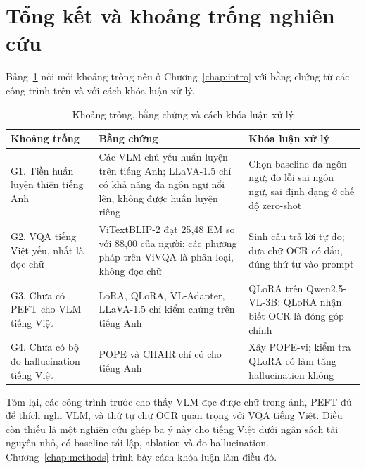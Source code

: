 \section{Tổng kết và khoảng trống nghiên cứu}
\label{sec:rel-summary}

Bảng~\ref{tab:rel-gaps} nối mỗi khoảng trống nêu ở Chương~\ref{chap:intro} với
bằng chứng từ các công trình trên và với cách khóa luận xử lý.

\begin{table}[htbp]
\caption{Khoảng trống, bằng chứng và cách khóa luận xử lý}
\label{tab:rel-gaps}
\centering
\small
\begin{tabular}{p{}p{}p{}}
\toprule
\textbf{Khoảng trống} & \textbf{Bằng chứng} & \textbf{Khóa luận xử lý} \\
\midrule
G1. Tiền huấn luyện thiên tiếng Anh & Các VLM chủ yếu huấn luyện trên tiếng Anh; LLaVA-1.5 chỉ có khả năng đa ngôn ngữ nổi lên, không được huấn luyện riêng & Chọn baseline đa ngôn ngữ; đo lỗi sai ngôn ngữ, sai định dạng ở chế độ zero-shot \\
G2. VQA tiếng Việt yếu, nhất là đọc chữ & ViTextBLIP-2 đạt 25,48 EM so với 88,00 của người; các phương pháp trên ViVQA là phân loại, không đọc chữ & Sinh câu trả lời tự do; đưa chữ OCR có dấu, đúng thứ tự vào prompt \\
G3. Chưa có PEFT cho VLM tiếng Việt & LoRA, QLoRA, VL-Adapter, LLaVA-1.5 chỉ kiểm chứng trên tiếng Anh & QLoRA trên Qwen2.5-VL-3B; QLoRA nhận biết OCR là đóng góp chính \\
G4. Chưa có bộ đo hallucination tiếng Việt & POPE và CHAIR chỉ có cho tiếng Anh & Xây POPE-vi; kiểm tra QLoRA có làm tăng hallucination không \\
\bottomrule
\end{tabular}
\end{table}

Tóm lại, các công trình trước cho thấy VLM đọc được chữ trong ảnh, PEFT đủ để
thích nghi VLM, và thứ tự chữ OCR quan trọng với VQA tiếng Việt. Điều còn thiếu là
một nghiên cứu ghép ba ý này cho tiếng Việt dưới ngân sách tài nguyên nhỏ, có
baseline tái lập, ablation và đo hallucination. Chương~\ref{chap:methods} trình
bày cách khóa luận làm điều đó.
